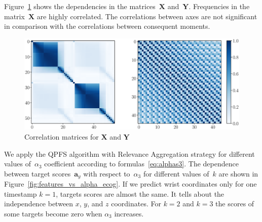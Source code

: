 \documentclass[12pt,twoside]{article}
\theoremstyle{definition}
\newcommand{\ba}{\mathbf{a}}
\newcommand{\bY}{\mathbf{Y}}
\newcommand{\bX}{\mathbf{X}}
\begin{document}
Figure~\ref{fig:corr_matrix} shows the dependencies in the matrices~$\bX$ and~$\bY$. Frequencies in the matrix~$\bX$ are highly correlated.
The correlations between axes are not significant in comparison with the correlations between consequent moments.
\begin{figure}[h]
	\includegraphics[width=\linewidth]{figs/corr_matrix.eps}
	\caption{Correlation matrices for $\bX$ and $\bY$}
	\label{fig:corr_matrix}
\end{figure}

We apply the QPFS algorithm with Relevance Aggregation strategy for different values of~$\alpha_3$ coefficient according to formulas~\eqref{eq:alphas3}.
The dependence between target scores~$\ba_y$ with respect to~$\alpha_3$ for different values of~$k$ are shown in Figure~\ref{fig:features_vs_alpha_ecog}.
If we predict wrist coordinates only for one timestamp $k = 1$, targets scores are almost the same.
It tells about the independence between $x$, $y$, and $z$ coordinates.
For $k = 2$ and $k = 3$ the scores of some targets become zero when $\alpha_3$ increases.
\end{document}
